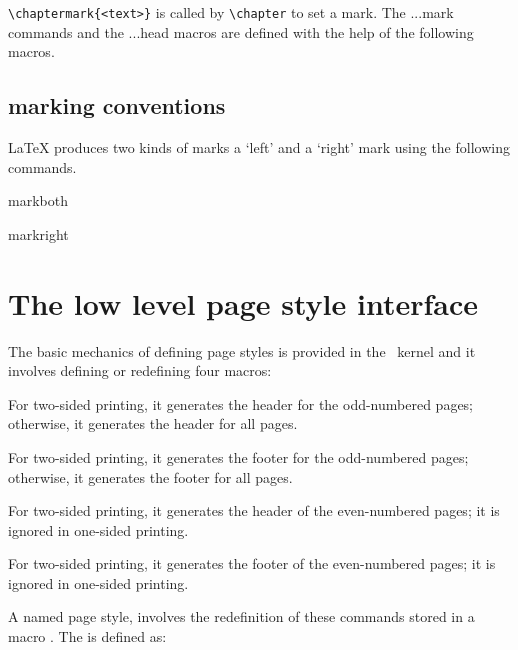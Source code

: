 \verb+\chaptermark{<text>}+ is called by \verb+\chapter+ to set a mark. The  ...mark commands and the ...head
macros are defined with the help of the following macros.



\subsection{marking conventions}

LaTeX produces two kinds of marks a `left' and a `right' mark using the following commands.

markboth

markright



\section{The low level page style interface}

The basic mechanics of defining page styles is provided in the \LaTeXe\ kernel and it  involves defining or redefining four macros:

\begin{marglist}
\item [\cs{oddhead}] For two-sided printing, it generates the header for the odd-numbered
pages; otherwise, it generates the header for all pages.

\item [\cs{oddfoot}] For two-sided printing, it generates the footer for the odd-numbered pages; otherwise, it generates the footer for all pages.

\item [\cs{evenhead}] For two-sided printing, it generates the header of the even-numbered
pages; it is ignored in one-sided printing.

\item [\cs{evenfoot}] For two-sided printing, it generates the footer of the even-numbered
pages; it is ignored in one-sided printing.

\end{marglist}
A named page style, involves the redefinition of these commands stored in a macro .
The  is defined as:



